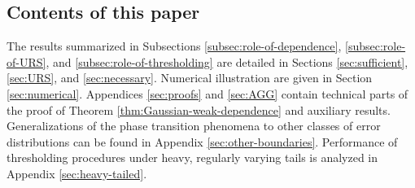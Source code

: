 \subsection{Contents of this paper}
The results summarized in Subsections \ref{subsec:role-of-dependence}, \ref{subsec:role-of-URS}, and \ref{subsec:role-of-thresholding} are detailed in Sections \ref{sec:sufficient}, \ref{sec:URS}, and \ref{sec:necessary}. Numerical illustration are given in Section \ref{sec:numerical}. 
Appendices \ref{sec:proofs} and \ref{sec:AGG} contain technical parts of the proof of Theorem \ref{thm:Gaussian-weak-dependence} and auxiliary results.
Generalizations of the phase transition phenomena to other classes of error distributions can be found in Appendix \ref{sec:other-boundaries}.
Performance of thresholding procedures under heavy, regularly varying tails is analyzed in Appendix \ref{sec:heavy-tailed}.

